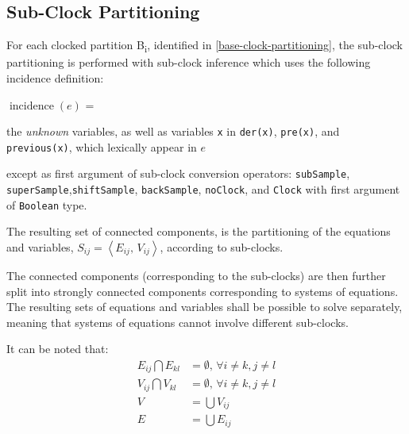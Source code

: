 \subsection{Sub-Clock Partitioning}\label{sub-clock-partitioning}

For each clocked partition B\textsubscript{i}, identified in
\cref{base-clock-partitioning}, the sub-clock partitioning is performed with sub-clock inference
which uses the following incidence definition:

$\operatorname{incidence}(e)$ =
\begin{list}{}{\setlength{\leftmargin}{2em}\setlength{\topsep}{-\parskip}}
\item
the \emph{unknown} variables, as well as variables \lstinline!x! in \lstinline!der(x)!, \lstinline!pre(x)!, and \lstinline!previous(x)!, which lexically appear in $e$
\begin{list}{}{\setlength{\leftmargin}{2em}\setlength{\topsep}{-\parskip}}
\item
except as first argument of sub-clock conversion operators: \lstinline!subSample!, \lstinline!superSample!,\linebreak[4] \lstinline!shiftSample!, \lstinline!backSample!, \lstinline!noClock!, and \lstinline!Clock! with first argument of \lstinline!Boolean! type.
\end{list}
\end{list}\vspace{\parskip}%

The resulting set of connected components, is the partitioning of the equations and variables, $S_{ij} = \left\langle E_{ij},\, V_{ij} \right\rangle$, according to sub-clocks.

The connected components (corresponding to the sub-clocks) are then further split into strongly connected components corresponding to systems of equations.
The resulting sets of equations and variables shall be possible to solve separately, meaning that systems of equations cannot involve different sub-clocks.

It can be noted that:
\begin{equation*}
\begin{aligned}
E_{ij} \bigcap E_{kl} &= \emptyset,\, \forall i\ne{}k, j\ne{}l \\
V_{ij} \bigcap V_{kl} &= \emptyset,\, \forall i\ne{}k, j\ne{}l \\
V &= \bigcup V_{ij} \\
E &= \bigcup E_{ij}
\end{aligned}
\end{equation*}

